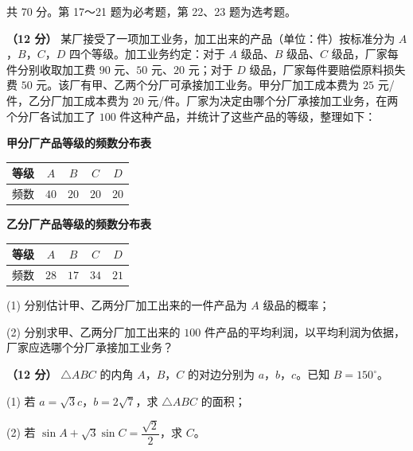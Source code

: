\begin{gktip}
共 70 分。第 17～21 题为必考题，第 22、23 题为选考题。
\end{gktip}


\begin{question}
\textbf{（12 分）} 某厂接受了一项加工业务，加工出来的产品（单位：件）按标准分为 $A$，$B$，$C$，$D$ 四个等级。加工业务约定：对于 $A$ 级品、$B$ 级品、$C$ 级品，厂家每件分别收取加工费 $90$ 元、$50$ 元、$20$ 元；对于 $D$ 级品，厂家每件要赔偿原料损失费 $50$ 元。该厂有甲、乙两个分厂可承接加工业务。甲分厂加工成本费为 $25$ 元/件，乙分厂加工成本费为 $20$ 元/件。厂家为决定由哪个分厂承接加工业务，在两个分厂各试加工了 $100$ 件这种产品，并统计了这些产品的等级，整理如下：

\textbf{甲分厂产品等级的频数分布表}

\begin{center}
\begin{tabular}{ccccc}
\toprule
等级 & $A$ & $B$ & $C$ & $D$ \\
\midrule
频数 & $40$ & $20$ & $20$ & $20$ \\
\bottomrule
\end{tabular}
\end{center}

\textbf{乙分厂产品等级的频数分布表}

\begin{center}
\begin{tabular}{ccccc}
\toprule
等级 & $A$ & $B$ & $C$ & $D$ \\
\midrule
频数 & $28$ & $17$ & $34$ & $21$ \\
\bottomrule
\end{tabular}
\end{center}

  (1) 分别估计甲、乙两分厂加工出来的一件产品为 $A$ 级品的概率；

  (2) 分别求甲、乙两分厂加工出来的 $100$ 件产品的平均利润，以平均利润为依据，厂家应选哪个分厂承接加工业务？

\end{question}
\begin{question}
\textbf{（12 分）} $\triangle ABC$ 的内角 $A$，$B$，$C$ 的对边分别为 $a$，$b$，$c$。已知 $B=150^\circ$。

  (1) 若 $a=\sqrt3c$，$b=2\sqrt7$，求 $\triangle ABC$ 的面积；

  (2) 若 $\sin A+\sqrt3\sin C=\dfrac{\sqrt2}2$，求 $C$。

\Needspace{0.4\textheight}
\end{question}
